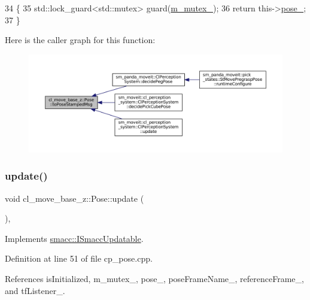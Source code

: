 \begin{DoxyCode}
34     \{
35         std::lock\_guard<std::mutex> guard(\hyperlink{classcl__move__base__z_1_1Pose_a73ed2daba3e473e156cab751fb37b58f}{m\_mutex\_});
36         \textcolor{keywordflow}{return} this->\hyperlink{classcl__move__base__z_1_1Pose_a9da7acf880968a3c220b8436fd0bb6ef}{pose\_};
37     \}
\end{DoxyCode}
Here is the caller graph for this function\+:
\nopagebreak
\begin{figure}[H]
\begin{center}
\leavevmode
\includegraphics[width=350pt]{classcl__move__base__z_1_1Pose_a63887a88c1ac6e9a4a71b8d7d11aed6c_icgraph}
\end{center}
\end{figure}
\mbox{\label{classcl__move__base__z_1_1Pose_abf99d1127cf51a93f97ada2031196114}} 
\subsubsection{\texorpdfstring{update()}{update()}}
{\footnotesize\ttfamily void cl\+\_\+move\+\_\+base\+\_\+z\+::\+Pose\+::update (\begin{DoxyParamCaption}{ }\end{DoxyParamCaption})\hspace{0.3cm}{\ttfamily [override]}, {\ttfamily [virtual]}}



Implements \hyperlink{classsmacc_1_1ISmaccUpdatable_a84ee0520cbefdb1d412bed54650b028e}{smacc\+::\+I\+Smacc\+Updatable}.



Definition at line 51 of file cp\+\_\+pose.\+cpp.



References is\+Initialized, m\+\_\+mutex\+\_\+, pose\+\_\+, pose\+Frame\+Name\+\_\+, reference\+Frame\+\_\+, and tf\+Listener\+\_\+.



